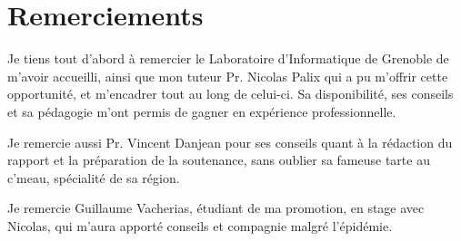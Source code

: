 \section*{Remerciements}

Je tiens tout d'abord à remercier le Laboratoire d'Informatique de Grenoble de 
m'avoir accueilli, ainsi que mon tuteur Pr. Nicolas Palix qui a pu m'offrir 
cette opportunité, et m'encadrer tout au long de celui-ci. Sa disponibilité, 
ses conseils et sa pédagogie m'ont permis de gagner en expérience 
professionnelle.

\vspace{5mm}

Je remercie aussi Pr. Vincent Danjean pour ses conseils quant à la rédaction du 
rapport et la préparation de la soutenance, sans oublier sa fameuse tarte au 
c'meau, spécialité de sa région.

\vspace{5mm}

Je remercie Guillaume Vacherias, étudiant de ma promotion, en stage avec 
Nicolas, qui m'aura apporté conseils et compagnie malgré l'épidémie.

\vspace{1.5cm}